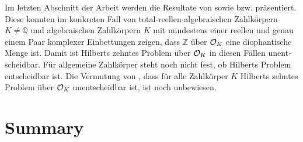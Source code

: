 \begin{german}
Im letzten Abschnitt der Arbeit werden die Resultate von \textcite{Denef1980}
sowie \textcite{Pheidas1988} bzw. \textcite{Shlapentokh1989} präsentiert. Diese
konnten im konkreten Fall von total-reellen algebraischen Zahlkörpern \(K ≠ ℚ\)
und algebraischen Zahlkörpern \(K\) mit mindestens einer reellen und genau einem
Paar komplexer Einbettungen zeigen, dass \(ℤ\) über \(\mathcal{O}_{K}\) eine
diophantische Menge ist. Damit ist Hilberts zehntes Problem über \(\mathcal{O}_{K}\) in
diesen Fällen unentscheidbar. Für allgemeine Zahlkörper steht noch nicht fest,
ob Hilberts Problem entscheidbar ist. Die Vermutung von \textcite{Denef1978},
dass für alle Zahlkörper \(K\) Hilberts zehntes Problem über \(\mathcal{O}_{K}\)
unentscheidbar ist, ist noch unbewiesen.
\end{german}

\section{Summary}
